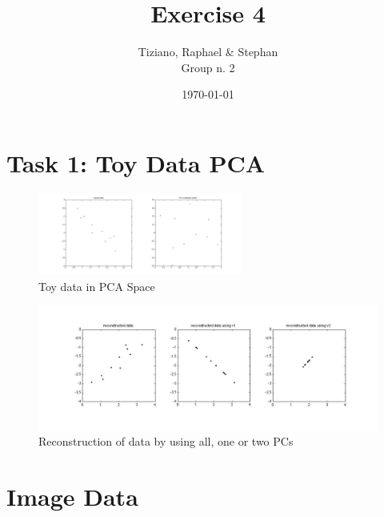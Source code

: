 \documentclass[]{article}
\title{Exercise 4}
\author{Tiziano, Raphael \& Stephan \\ Group n. 2}
\date{\today}
\begin{document}
\ifpdf
{}
\else
{}
\fi

\maketitle


\section{Task 1: Toy Data PCA}
\begin{figure}[h]
	\centering
		\includegraphics[width=0.6\textwidth]{projection.jpg}
	\caption{Toy data in PCA Space}
	\label{sg:fig:projection}
\end{figure}

\begin{figure}[h]
	\centering
		\includegraphics[width=\textwidth]{reconstruction.jpg}
	\caption{Reconstruction of data by using all, one or two PCs}
	\label{sg:fig:reconstruction}
\end{figure}

\section{Image Data} %
\label{sg:sec:image_data}
\end{document}
